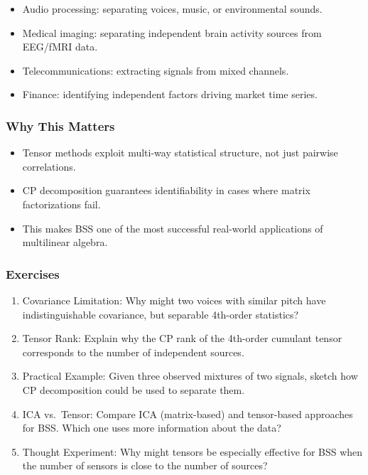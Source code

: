 \documentclass[
  letterpaper,
  DIV=11,
  numbers=noendperiod]{scrreprt}
\providecommand{\tightlist}{%
  \setlength{\itemsep}{0pt}\setlength{\parskip}{0pt}}
\begin{document}
\begin{itemize}
\tightlist
\item
  Audio processing: separating voices, music, or environmental sounds.
\item
  Medical imaging: separating independent brain activity sources from
  EEG/fMRI data.
\item
  Telecommunications: extracting signals from mixed channels.
\item
  Finance: identifying independent factors driving market time series.
\end{itemize}

\subsubsection{Why This Matters}\label{why-this-matters-47}

\begin{itemize}
\tightlist
\item
  Tensor methods exploit multi-way statistical structure, not just
  pairwise correlations.
\item
  CP decomposition guarantees identifiability in cases where matrix
  factorizations fail.
\item
  This makes BSS one of the most successful real-world applications of
  multilinear algebra.
\end{itemize}

\subsubsection{Exercises}\label{exercises-61}

\begin{enumerate}
\def\labelenumi{\arabic{enumi}.}
\item
  Covariance Limitation: Why might two voices with similar pitch have
  indistinguishable covariance, but separable 4th-order statistics?
\item
  Tensor Rank: Explain why the CP rank of the 4th-order cumulant tensor
  corresponds to the number of independent sources.
\item
  Practical Example: Given three observed mixtures of two signals,
  sketch how CP decomposition could be used to separate them.
\item
  ICA vs.~Tensor: Compare ICA (matrix-based) and tensor-based approaches
  for BSS. Which one uses more information about the data?
\item
  Thought Experiment: Why might tensors be especially effective for BSS
  when the number of sensors is close to the number of sources?
\end{enumerate}
\end{document}
